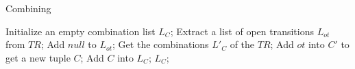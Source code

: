 \documentclass{lncs/llncs}
\begin{document}
\begin{algorithm}
\caption{Combining}
\begin{algorithmic}[1]

\State Initialize an empty combination list $L_C$;
\State Extract a list of open transitions $L_{ot}$ from $TR$;
\State Add $null$ to $L_{ot}$;
\State Get the combinations $L'_C$ of the $TR$;
		\State Add $ot$ into $C'$ to get a new tuple $C$;
		\State Add $C$ into $L_C$;
	\EndFor
\EndFor 
\State \Return $L_C$;

\end{algorithmic}  
\end{algorithm}

\end{document}
